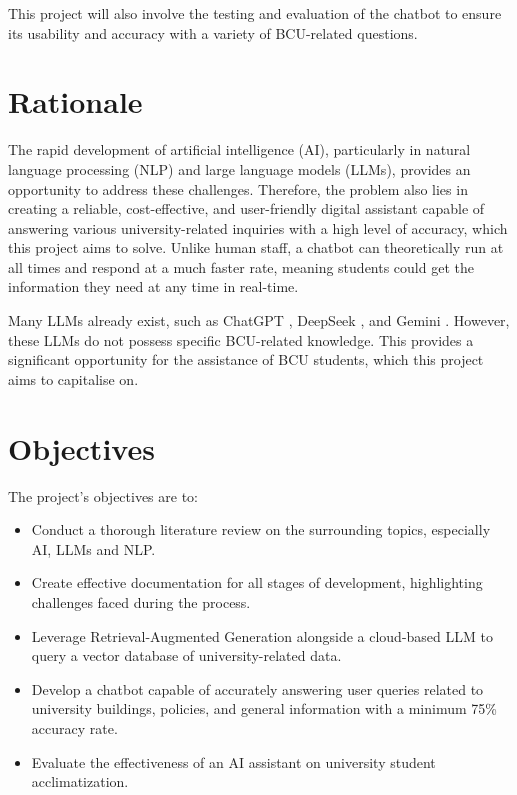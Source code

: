 \para This project will also involve the testing and evaluation of the chatbot to ensure its usability and accuracy with a variety of BCU-related 
questions.

\section{Rationale}
The rapid development of artificial intelligence (AI), particularly in natural language processing (NLP) and large language models (LLMs), provides 
an opportunity to address these challenges. Therefore, the problem also lies in creating a reliable, cost-effective, and user-friendly digital 
assistant capable of answering various university-related inquiries with a high level of accuracy, which this project 
aims to solve. Unlike human staff, a chatbot can theoretically run at all times and respond at a much faster rate, 
meaning students could get the information they need at any time in real-time.

\para Many LLMs already exist, such as ChatGPT \autocite{openaiChatGPT}, DeepSeek \autocite{deepseekDeepSeek}, and 
Gemini \autocite{googleGeminiChatSupercharge}. However, these LLMs do not possess specific BCU-related knowledge. 
This provides a significant opportunity for the assistance of BCU students, which this project aims to capitalise on.

\section{Objectives}\label{sec:AimsAndObjectives}
The project's objectives are to:

\begin{itemize}
    \item Conduct a thorough literature review on the surrounding topics, especially AI, LLMs and NLP.
    \item Create effective documentation for all stages of development, highlighting challenges faced during the process.
    \item Leverage Retrieval-Augmented Generation alongside a cloud-based LLM to query a vector database of university-related data.
    \item Develop a chatbot capable of accurately answering user queries related to university 
    buildings, policies, and general information with a minimum 75\% accuracy rate.
    \item Evaluate the effectiveness of an AI assistant on university student acclimatization.
\end{itemize}

